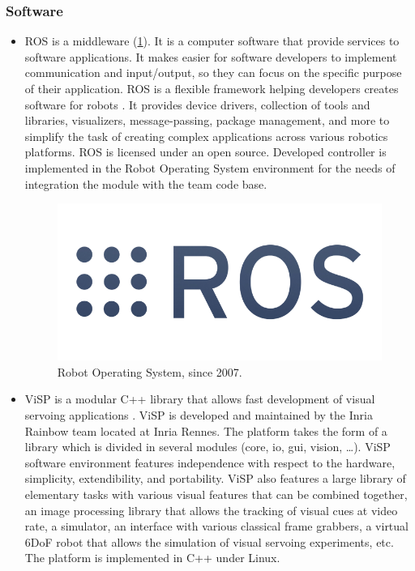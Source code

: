 \subsubsection{Software}
\begin{itemize}
    \item 
\gls{ROS} is a middleware (\ref{pict:ros}). It is a computer software that provide services to software applications. It makes easier for software developers to implement communication and input/output, so they can focus on the specific purpose of their application.
\gls{ROS} is a flexible framework helping developers creates software for robots \cite{288}. It provides device drivers, collection of tools and libraries, visualizers, message-passing, package management, and more to simplify the task of creating complex applications across various robotics platforms. ROS is licensed under an open source. Developed controller is implemented in the Robot Operating System environment for the needs of integration the module with the team code base.
\begin{figure} [!ht]
    \centering
    \includegraphics[width=0.35\linewidth]{images/ros.png}
    \caption{Robot Operating System, since 2007.}
    \label{pict:ros}
\end{figure}
    \item
\gls{ViSP} is a modular C++ library that allows fast development of visual servoing applications \cite{articlevisp}. ViSP is developed and maintained by the Inria Rainbow team located at Inria Rennes. The platform takes the form of a library which is divided in several modules (core, io, gui, vision, …). ViSP software environment features independence with respect to the hardware, simplicity, extendibility, and portability. ViSP also features a large library of elementary tasks with various visual features that can be combined together, an image processing library that allows the tracking of visual cues at video rate, a simulator, an interface with various classical frame grabbers, a virtual 6DoF robot that allows the simulation of visual servoing experiments, etc. The platform is implemented in C++ under Linux.


\end{itemize}
